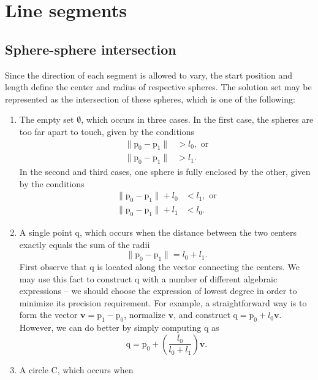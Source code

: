 \documentclass{article}
\newcommand{\mPoint}[1]{\mathrm{#1}}
\newcommand{\mPt}[1]{\mPoint{#1}}
\newcommand{\mVector}[1]{\mathbf{#1}}
\newcommand{\mVc}[1]{\mVector{#1}}
\newcommand{\mSet}[1]{\mathrm{#1}}
\begin{document}
\section{Line segments}

\subsection{Sphere-sphere intersection}

Since the direction of each segment is allowed to vary, the start position and
length define the center and radius of respective spheres. The solution set may
be represented as the intersection of these spheres, which is one of the
following:
\begin{enumerate}
  \item The empty set $\emptyset$, which occurs in three cases. In the first
  case, the spheres are too far apart to touch, given by the conditions
  \begin{align} 
  \|\mPt{p_0}-\mPt{p_1}\| &> l_0,\text{ or} \\
  \|\mPt{p_0}-\mPt{p_1}\| &> l_1. 
  \end{align}
  In the second and third cases, one sphere is fully enclosed by the other,
  given by the conditions 
  \begin{align}
  \|\mPt{p_0}-\mPt{p_1}\| + l_0 &< l_1,\text{ or} \\
  \|\mPt{p_0}-\mPt{p_1}\| + l_1 &< l_0.
  \end{align}
  \item A single point $\mPt{q}$, which occurs when the distance between the two
  centers exactly equals the sum of the radii
  \begin{equation}
  \|\mPt{p_0}-\mPt{p_1}\|=l_0+l_1. 
  \end{equation}
  First observe that $\mPt{q}$ is located along the vector connecting the
  centers. We may use this fact to construct $\mPt{q}$ with a number of
  different algebraic expressions -- we should choose the expression of
  lowest degree in order to minimize its precision requirement. For example, a
  straightforward way is to form the vector $\mVc{v} = \mPt{p_1}-\mPt{p_0}$,
  normalize $\mVc{v}$, and construct $\mPt{q} = \mPt{p_0}+l_0\mVc{v}$. However,
  we can do better by simply computing $\mPt{q}$ as
  \begin{equation}
  \mPt{q} = \mPt{p_0}+\left(\frac{l_0}{l_0+l_1}\right)\mVc{v}.
  \end{equation}
  \item A circle $\mSet{C}$, which occurs when

\end{enumerate}
\end{document}
